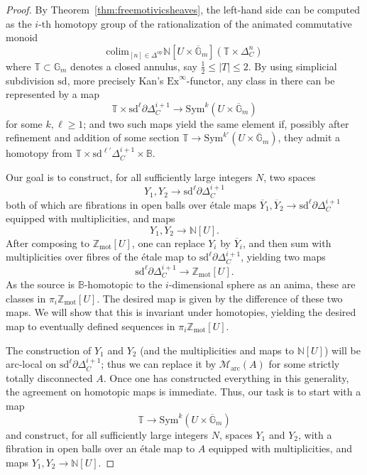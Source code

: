 \documentclass[11pt]{amsart}
\numberwithin{equation}{section}
\numberwithin{theorem}{section}
\theoremstyle{definition}
\begin{document}
\begin{proof}
By Theorem~\ref{thm:freemotivicsheaves}, the left-hand side can be computed as the $i$-th homotopy group of the rationalization of the animated commutative monoid
\[
\mathrm{colim}_{[n]\in \Delta^{\mathrm{op}}} \mathbb N[U\times \overline{\mathbb G}_m](\mathbb T\times \Delta^n_C)
\]
where $\mathbb T\subset \mathbb G_m$ denotes a closed annulus, say $\tfrac 12\leq |T|\leq 2$. By using simplicial subdivision $\mathrm{sd}$, more precisely Kan's $\mathrm{Ex}^\infty$-functor, any class in there can be represented by a map
\[
\mathbb T\times \mathrm{sd}^\ell\partial\Delta^{i+1}_C\to \mathrm{Sym}^k(U\times \overline{\mathbb G}_m)
\]
for some $k,\ell\geq 1$; and two such maps yield the same element if, possibly after refinement and addition of some section $\mathbb T\to \mathrm{Sym}^{k'}(U\times \overline{\mathbb G}_m)$, they admit a homotopy from $\mathbb T\times \mathrm{sd}^{\ell'}\Delta^{i+1}_C\times \mathbb B$.

Our goal is to construct, for all sufficiently large integers $N$, two spaces
\[
Y_1,Y_2\to \mathrm{sd}^\ell\partial\Delta^{i+1}_C
\]
both of which are fibrations in open balls over \'etale maps $\overline{Y}_1,\overline{Y}_2\to \mathrm{sd}^\ell\partial\Delta^{i+1}_C$ equipped with multiplicities, and maps
\[
Y_1,Y_2\to \mathbb N[U].
\]
After composing to $\mathbb Z_{\mathrm{mot}}[U]$, one can replace $Y_i$ by $\overline{Y}_i$, and then sum with multiplicities over fibres of the \'etale map to $\mathrm{sd}^\ell\partial\Delta^{i+1}_C$, yielding two maps
\[
\mathrm{sd}^\ell\partial\Delta^{i+1}_C\to \mathbb Z_{\mathrm{mot}}[U].
\]
As the source is $\mathbb B$-homotopic to the $i$-dimensional sphere as an anima, these are classes in $\pi_i \mathbb Z_{\mathrm{mot}}[U]$. The desired map is given by the difference of these two maps. We will show that this is invariant under homotopies, yielding the desired map to eventually defined sequences in $\pi_i \mathbb Z_{\mathrm{mot}}[U]$.

The construction of $Y_1$ and $Y_2$ (and the multiplicities and maps to $\mathbb N[U]$) will be arc-local on $\mathrm{sd}^\ell \partial\Delta^{i+1}_C$; thus we can replace it by $\mathcal M_{\mathrm{arc}}(A)$ for some strictly totally disconnected $A$. Once one has constructed everything in this generality, the agreement on homotopic maps is immediate. Thus, our task is to start with a map
\[
\mathbb T\to \mathrm{Sym}^k(U\times \overline{\mathbb G}_m)
\]
and construct, for all sufficiently large integers $N$, spaces $Y_1$ and $Y_2$, with a fibration in open balls over an \'etale map to $A$ equipped with multiplicities, and maps $Y_1,Y_2\to \mathbb N[U]$.


\end{proof}
\end{document}
